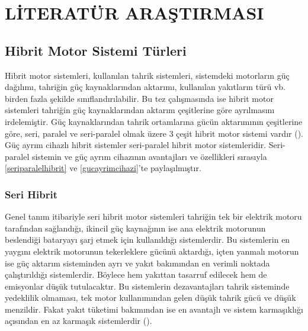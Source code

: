 \chapter{LİTERATÜR ARAŞTIRMASI}

\section{Hibrit Motor Sistemi Türleri}

Hibrit motor sistemleri, kullanılan tahrik sistemleri, sistemdeki motorların güç dağılımı, tahriğin güç kaynaklarından aktarımı, kullanılan yakıtların türü vb. birden fazla şekilde sınıflandırılabilir. Bu tez çalışmasında ise
hibrit motor sistemleri tahriğin güç kaynaklarından aktarım çeşitlerine göre ayrılmasını irdelemiştir. Güç kaynaklarından 
tahrik ortamlarına gücün aktarımının çeşitlerine göre, seri, paralel ve seri-paralel olmak üzere 3 çeşit hibrit motor sistemi vardır (\cite{typesofhybrid}).
Güç ayrım cihazlı hibrit sistemler seri-paralel hibrit motor sistemleridir. Seri-paralel sistemin ve güç ayrım cihazının avantajları ve özellikleri sırasıyla \ref{seriparalelhibrit} ve \ref{gucayrimcihazi}'te paylaşılmıştır.

\subsection{Seri Hibrit}
\label{serihibrit}
Genel tanım itibariyle seri hibrit motor sistemleri tahriğin tek bir elektrik motoru tarafından sağlandığı, ikincil güç kaynağının ise ana elektrik motorunun beslendiği
bataryayı şarj etmek için kullanıldığı sistemlerdir. Bu sistemlerin en yaygını elektrik motorunun tekerleklere gücünü aktardığı, içten yanmalı motorun ise güç aktarım sisteminden ayrı ve yakıt bakımından
en verimli noktada çalıştırıldığı sistemlerdir. Böylece hem yakıttan tasarruf edilecek hem de emisyonlar düşük tutulacaktır. Bu sistemlerin dezavantajları tahrik sisteminde yedeklilik olmaması,
tek motor kullanımından gelen düşük tahrik gücü ve düşük menzildir. Fakat yakıt tüketimi bakımından ise en avantajlı ve sistem karmaşıklığı açısından
en az karmaşık sistemlerdir (\cite{serieshybrid}).

